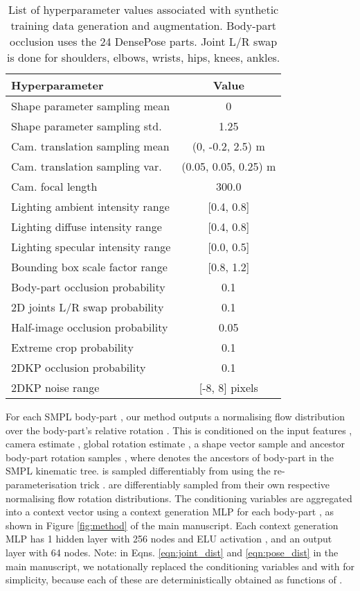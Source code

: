 \begin{table}[t]
\centering
\small
\begin{tabular}{l c}
    \hline
    \textbf{Hyperparameter} & \textbf{Value}\\
    \hline
    Shape parameter sampling mean & 0 \\
    Shape parameter sampling std. & 1.25 \\
    Cam. translation sampling mean & (0, -0.2, 2.5) m\\
    Cam. translation sampling var. & (0.05, 0.05, 0.25) m\\
    Cam. focal length & 300.0\\
    Lighting ambient intensity range & [0.4, 0.8]\\
    Lighting diffuse intensity range & [0.4, 0.8]\\
    Lighting specular intensity range & [0.0, 0.5]\\
    Bounding box scale factor range & [0.8, 1.2]\\
    \hline
    Body-part occlusion probability & 0.1 \\
    2D joints L/R swap probability & 0.1\\
    Half-image occlusion probability & 0.05\\
    Extreme crop probability & 0.1\\
    2DKP occlusion probability & 0.1\\
    2DKP noise range & [-8, 8] pixels\\
    \hline
    \end{tabular}
\caption{List of hyperparameter values associated with synthetic training data generation and augmentation. Body-part occlusion uses the 24 DensePose \cite{Guler2018DensePose} parts. Joint L/R swap is done for shoulders, elbows, wrists, hips, knees, ankles.}
\vspace{-0.7cm}
\label{tab:supmat_synthetic_data}
\end{table}

For each SMPL body-part , our method outputs a normalising flow distribution over the body-part's relative rotation . This is conditioned on the input features , camera estimate , global rotation estimate , a shape vector sample  and ancestor body-part rotation samples , where  denotes the ancestors of body-part  in the SMPL kinematic tree.  is sampled differentiably from  using the re-parameterisation trick \cite{kingma2014autoencoding}.  are differentiably sampled from their own respective normalising flow rotation distributions. The conditioning variables  are aggregated into a context vector  using a context generation MLP for each body-part , as shown in Figure \ref{fig:method} of the main manuscript. Each context generation MLP has 1 hidden layer with 256 nodes and ELU activation \cite{clevert2016elu}, and an output layer with 64 nodes. Note: in Eqns. \ref{eqn:joint_dist} and \ref{eqn:pose_dist} in the main manuscript, we notationally replaced the conditioning variables  and  with  for simplicity, because each of these are deterministically obtained as functions of .


